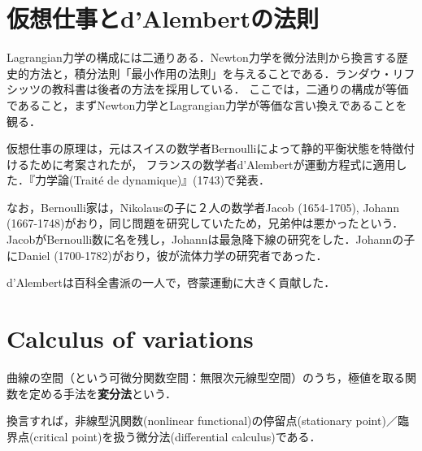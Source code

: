 \documentclass[uplatex,dvipdfmx]{jsreport}
\begin{document}
\section{仮想仕事とd'Alembertの法則}

\begin{screen}
    Lagrangian力学の構成には二通りある．Newton力学を微分法則から換言する歴史的方法と，積分法則「最小作用の法則」を与えることである．ランダウ・リフシッツの教科書は後者の方法を採用している．
    ここでは，二通りの構成が等価であること，まずNewton力学とLagrangian力学が等価な言い換えであることを観る．
\end{screen}

\begin{axiom}

\end{axiom}
\begin{remark}
    仮想仕事の原理は，元はスイスの数学者Bernoulliによって静的平衡状態を特徴付けるために考案されたが，
    フランスの数学者d'Alembertが運動方程式に適用した．『力学論(Traité de dynamique)』(1743)で発表．

    なお，Bernoulli家は，Nikolausの子に２人の数学者Jacob (1654-1705), Johann (1667-1748)がおり，同じ問題を研究していたため，兄弟仲は悪かったという．
    JacobがBernoulli数に名を残し，Johannは最急降下線の研究をした．Johannの子にDaniel (1700-1782)がおり，彼が流体力学の研究者であった．

    d'Alembertは百科全書派の一人で，啓蒙運動に大きく貢献した．
\end{remark}

\section{Calculus of variations}

\begin{definition}
    曲線の空間（という可微分関数空間：無限次元線型空間）のうち，極値を取る関数を定める手法を\textbf{変分法}という．

    換言すれば，非線型汎関数(nonlinear functional)の停留点(stationary point)／臨界点(critical point)を扱う微分法(differential calculus)である．
\end{definition}
\end{document}
